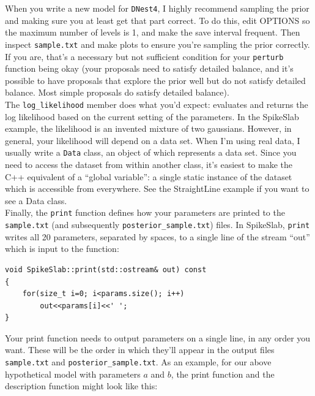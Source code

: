 \documentclass[a4paper, 11pt]{article}
\newcommand{\dnest}{{\tt DNest4}}
\begin{document}
When you write a new model for \dnest, I highly recommend sampling the prior
and making sure you at least get that part correct. To do this, edit OPTIONS
so the maximum number of levels is 1, and make the save interval frequent.
Then inspect {\tt sample.txt} and make plots to ensure you're sampling the
prior correctly. If you are, that's a necessary but not sufficient condition
for your {\tt perturb} function being okay (your proposals need to satisfy
detailed balance, and it's possible to have proposals that explore the prior
well but do not satisfy detailed balance. Most simple proposals do satisfy
detailed balance).\\

The {\tt log_likelihood} member does what you'd expect: evaluates and returns
the log likelihood based on the current setting of the parameters. In the
SpikeSlab example, the likelihood is an invented mixture of two gaussians.
However, in general, your likelihood will depend on a data set. When I'm using
real data, I usually write a {\tt Data} class, an object of which represents
a data set. Since you need to access the dataset from within another class,
it's easiest to make the C++ equivalent of a ``global variable'': a single
static instance of the dataset which is accessible from everywhere. See
the StraightLine example if you want to see a Data class.\\

Finally, the {\tt print} function defines how your parameters are printed to the
{\tt sample.txt} (and subsequently {\tt posterior\_sample.txt}) files. In
SpikeSlab, {\tt print} writes all 20 parameters, separated by
spaces, to a single line of the stream ``out'' which is input to the function:\\

\begin{framed}
\begin{verbatim}
void SpikeSlab::print(std::ostream& out) const
{
    for(size_t i=0; i<params.size(); i++)
        out<<params[i]<<' ';
}
\end{verbatim}
\end{framed}

Your print function needs to output parameters on a single line, in any order
you want. These will be the order in which they'll appear in the output files
{\tt sample.txt} and {\tt posterior\_sample.txt}. As an example, for our
above hypothetical model with parameters $a$ and $b$, the print function
and the description function might look like this:
\end{document}

